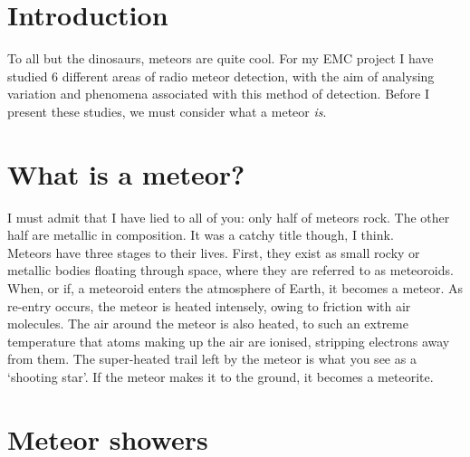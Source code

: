 \documentclass[12pt]{article}
\begin{document}
\section{Introduction}

\large{
To all but the dinosaurs, meteors are quite cool. For my EMC project I have
studied 6 different areas of radio meteor detection, with the aim of analysing
variation and phenomena associated with this method of detection. Before I
present these studies, we must consider what a meteor {\it is}.  
}

\section{What is a meteor?}

\large{
I must admit that I have lied to all of you: only half of meteors rock. The
other half are metallic in composition. It was a catchy title though, I think.\\

Meteors have three stages to their lives. First, they exist as small rocky or
metallic bodies floating through space, where they are referred to as
meteoroids. When, or if, a meteoroid enters the atmosphere of Earth, it becomes
a meteor. As re-entry occurs, the meteor is heated intensely, owing to friction
with air molecules. The air around the meteor is also heated, to such an extreme
temperature that atoms making up the air are ionised, stripping electrons away
from them. The super-heated trail left by the meteor is what you see as a
`shooting star'. If the meteor makes it to the ground, it becomes a meteorite.
}

\section{Meteor showers}
\end{document}
